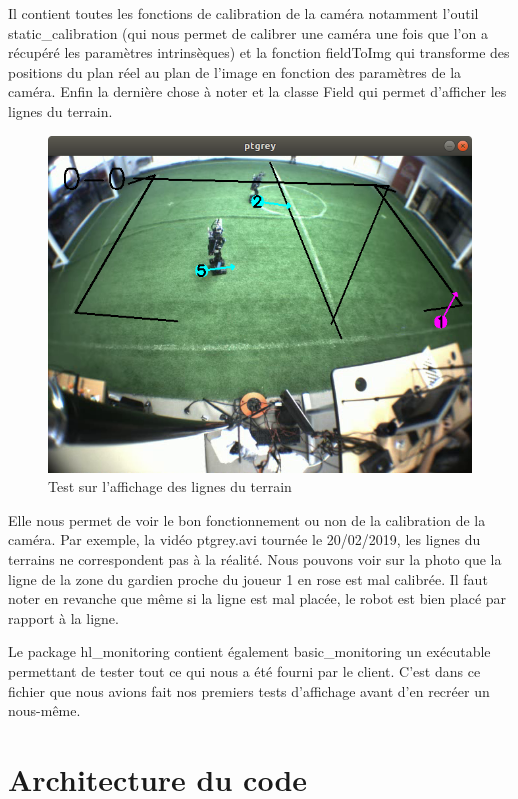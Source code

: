 Il contient toutes les fonctions de calibration de la caméra notamment l'outil static\_calibration (qui nous permet de calibrer une caméra une fois que l'on a récupéré les paramètres intrinsèques) et la fonction fieldToImg qui transforme des positions du plan réel au plan de l'image en fonction des paramètres de la caméra. Enfin la dernière chose à noter et la classe Field qui permet d'afficher les lignes du terrain. 
\bigskip
\begin{figure}[h] 
\centering 
\includegraphics[scale = 0.3]{images/test2.png}
    \caption{Test sur l'affichage des lignes du terrain}
    \label{fig:field}
\end{figure} 


Elle nous permet de voir le bon fonctionnement ou non de la calibration de la caméra. Par exemple, la vidéo ptgrey.avi tournée le 20/02/2019, les lignes du terrains ne correspondent pas à la réalité. Nous pouvons voir sur la photo que la ligne de la zone du gardien proche du joueur 1 en rose est mal calibrée. Il faut noter en revanche que même si la ligne est mal placée, le robot est bien placé par rapport à la ligne.
\bigskip

Le package hl\_monitoring contient également basic\_monitoring un exécutable permettant de tester tout ce qui nous a été fourni par le client. C'est dans ce fichier que nous avions fait nos premiers tests d'affichage avant d'en recréer un nous-même.

\section{Architecture du code}


